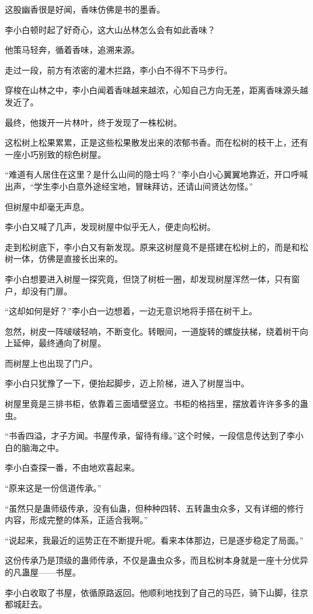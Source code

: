 \begin{this_body}
这股幽香很是好闻，香味仿佛是书的墨香。

李小白顿时起了好奇心，这大山丛林怎么会有如此香味？

他策马轻奔，循着香味，追溯来源。

走过一段，前方有浓密的灌木拦路，李小白不得不下马步行。

穿梭在山林之中，李小白闻着香味越来越浓，心知自己方向无差，距离香味源头越发近了。

最终，他拨开一片林叶，终于发现了一株松树。

这松树上松果累累，正是这些松果散发出来的浓郁书香。而在松树的枝干上，还有一座小巧别致的棕色树屋。

“难道有人居住在这里？是什么山间的隐士吗？”李小白小心翼翼地靠近，开口呼喊出声，“学生李小白意外途经宝地，冒昧拜访，还请山间贤达勿怪。”

但树屋中却毫无声息。

李小白又喊了几声，发现树屋中似乎无人，便走向松树。

走到松树底下，李小白又有新发现。原来这树屋竟不是搭建在松树上的，而是和松树一体，仿佛是直接长出来的。

李小白想要进入树屋一探究竟，但饶了树桩一圈，却发现树屋浑然一体，只有窗户，却没有门扉。

“这却如何是好？”李小白一边想着，一边无意识地将手搭在树干上。

忽然，树皮一阵啵啵轻响，不断变化。转眼间，一道旋转的螺旋扶梯，绕着树干向上延伸，最终通向了树屋。

而树屋上也出现了门户。

李小白只犹豫了一下，便抬起脚步，迈上阶梯，进入了树屋当中。

树屋里竟是三排书柜，依靠着三面墙壁竖立。书柜的格挡里，摆放着许许多多的蛊虫。

“书香四溢，才子方闻。书屋传承，留待有缘。”这个时候，一段信息传达到了李小白的脑海之中。

李小白查探一番，不由地欢喜起来。

“原来这是一份信道传承。”

“虽然只是蛊师级传承，没有仙蛊，但种种四转、五转蛊虫众多，又有详细的修行内容，形成完整的体系，正适合我啊。”

“说起来，我最近的运势正在不断提升呢。看来本体那边，已是逐步稳定了局面。”

这份传承乃是顶级的蛊师传承，不仅是蛊虫众多，而且松树本身就是一座十分优异的凡蛊屋——书屋。

李小白收取了书屋，依循原路返回。他顺利地找到了自己的马匹，骑下山脚，往京都城赶去。


\end{this_body}
